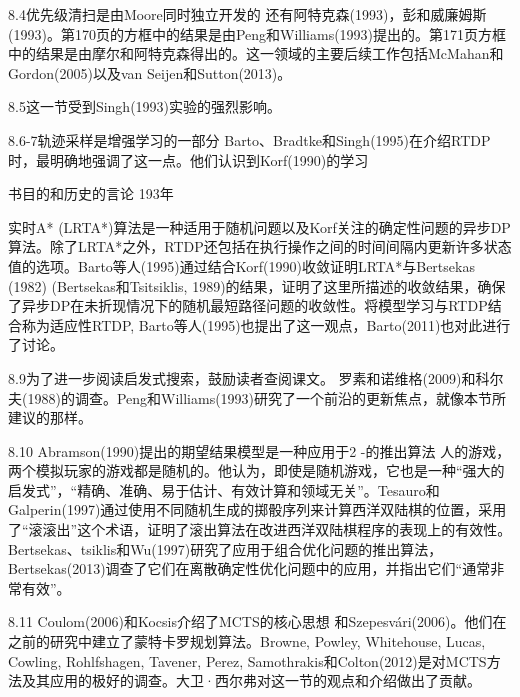 8.4优先级清扫是由Moore同时独立开发的
还有阿特克森(1993)，彭和威廉姆斯(1993)。第170页的方框中的结果是由Peng和Williams(1993)提出的。第171页方框中的结果是由摩尔和阿特克森得出的。这一领域的主要后续工作包括McMahan和Gordon(2005)以及van Seijen和Sutton(2013)。

8.5这一节受到Singh(1993)实验的强烈影响。

8.6-7轨迹采样是增强学习的一部分
Barto、Bradtke和Singh(1995)在介绍RTDP时，最明确地强调了这一点。他们认识到Korf(1990)的学习

书目的和历史的言论 					193年



实时A* (LRTA*)算法是一种适用于随机问题以及Korf关注的确定性问题的异步DP算法。除了LRTA*之外，RTDP还包括在执行操作之间的时间间隔内更新许多状态值的选项。Barto等人(1995)通过结合Korf(1990)收敛证明LRTA*与Bertsekas (1982) (Bertsekas和Tsitsiklis, 1989)的结果，证明了这里所描述的收敛结果，确保了异步DP在未折现情况下的随机最短路径问题的收敛性。将模型学习与RTDP结合称为适应性RTDP, Barto等人(1995)也提出了这一观点，Barto(2011)也对此进行了讨论。

8.9为了进一步阅读启发式搜索，鼓励读者查阅课文。
罗素和诺维格(2009)和科尔夫(1988)的调查。Peng和Williams(1993)研究了一个前沿的更新焦点，就像本节所建议的那样。

8.10 Abramson(1990)提出的期望结果模型是一种应用于2 -的推出算法
人的游戏，两个模拟玩家的游戏都是随机的。他认为，即使是随机游戏，它也是一种“强大的启发式”，“精确、准确、易于估计、有效计算和领域无关”。Tesauro和Galperin(1997)通过使用不同随机生成的掷骰序列来计算西洋双陆棋的位置，采用了“滚滚出”这个术语，证明了滚出算法在改进西洋双陆棋程序的表现上的有效性。Bertsekas、tsiklis和Wu(1997)研究了应用于组合优化问题的推出算法，Bertsekas(2013)调查了它们在离散确定性优化问题中的应用，并指出它们“通常非常有效”。

8.11 Coulom(2006)和Kocsis介绍了MCTS的核心思想
和Szepesvári(2006)。他们在之前的研究中建立了蒙特卡罗规划算法。Browne, Powley, Whitehouse, Lucas, Cowling, Rohlfshagen, Tavener, Perez, Samothrakis和Colton(2012)是对MCTS方法及其应用的极好的调查。大卫·西尔弗对这一节的观点和介绍做出了贡献。

